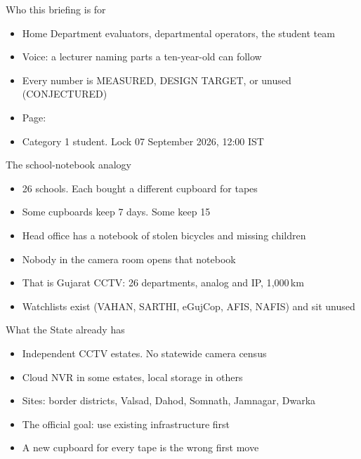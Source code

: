 \documentclass[aspectratio=169,11pt]{beamer}
\begin{document}
\titleframecsf


\begin{frame}{Who this briefing is for}
\begin{itemize}\itemsep0.7em
\item Home Department evaluators, departmental operators, the student team
\item Voice: a lecturer naming parts a ten-year-old can follow
\item Every number is MEASURED, DESIGN TARGET, or unused (CONJECTURED)
\item Page: 
\item Category 1 student. Lock 07 September 2026, 12:00 IST
\end{itemize}
\end{frame}

\begin{frame}{The school-notebook analogy}
\begin{itemize}\itemsep0.65em
\item 26 schools. Each bought a different cupboard for tapes
\item Some cupboards keep 7 days. Some keep 15
\item Head office has a notebook of stolen bicycles and missing children
\item Nobody in the camera room opens that notebook
\item That is Gujarat CCTV: 26 departments, analog and IP, 1{,}000\,km
\item Watchlists exist (VAHAN, SARTHI, eGujCop, AFIS, NAFIS) and sit unused
\end{itemize}
\end{frame}

\begin{frame}{What the State already has}
\begin{itemize}\itemsep0.65em
\item Independent CCTV estates. No statewide camera census
\item Cloud NVR in some estates, local storage in others
\item Sites: border districts, Valsad, Dahod, Somnath, Jamnagar, Dwarka
\item The official goal: use existing infrastructure first
\item A new cupboard for every tape is the wrong first move
\end{itemize}
\end{frame}
\end{document}
